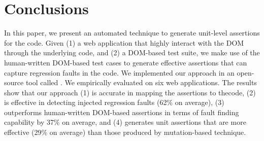 \section{Conclusions} \label{Sec:concs}
In this paper, we present an automated technique to generate unit-level assertions for the \javascript code. Given (1) a web application that highly interact with the DOM through the underlying \javascript code, and (2) a DOM-based test suite, we make use of the human-written DOM-based test cases to generate effective assertions that can capture regression faults in the \javascript code. We implemented our approach in an open-source tool called \tool. We empirically evaluated \tool on six web applications. The results show that our approach (1) is accurate in mapping the assertions to the\javascript code, (2) is effective in detecting injected regression faults (62\% on average), (3) outperforms human-written DOM-based assertions in terms of fault finding capability by 37\% on average, and (4) generates unit assertions that are more effective (29\% on average) than those produced by mutation-based technique.